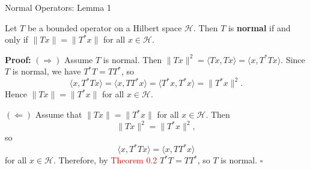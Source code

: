 \documentclass[9pt, aspectratio=169]{beamer}
\begin{document}
\begin{frame}{Normal Operators: Lemma 1}

\begin{tcolorbox}[colback=blue!5, colframe=blue!20!orange, title=Lemma 1]
Let $T$ be a bounded operator on a Hilbert space $\mathcal{H}$. Then $T$ is \textbf{normal} if and only if $\|Tx\|=\|T^*x\|$ for all $x\in\mathcal{H}$.
\end{tcolorbox}
\pause
\textbf{Proof:} $(\Rightarrow)$ Assume $T$ is normal. Then
$
\|Tx\|^2=\langle Tx,Tx\rangle=\langle x,T^*Tx\rangle.
$
Since $T$ is normal, we have $T^*T=TT^*$, so
\[
\langle x,T^*Tx\rangle=\langle x,TT^*x\rangle=\langle T^*x,T^*x\rangle=\|T^*x\|^2.
\]
Hence $\|Tx\|=\|T^*x\|$ for all $x\in\mathcal{H}$.

\pause

$(\Leftarrow)$ Assume that $\|Tx\|=\|T^*x\|$ for all $x\in\mathcal{H}$. Then
\[
\|Tx\|^2=\|T^*x\|^2,
\]
so
\[
\langle x,T^*Tx\rangle=\langle x,TT^*x\rangle
\]
for all $x\in\mathcal{H}$. Therefore, by \textcolor{red}{Theorem 0.2}
 $T^*T=TT^*$, so $T$ is normal. $\square$ 



\end{frame}
\end{document}
